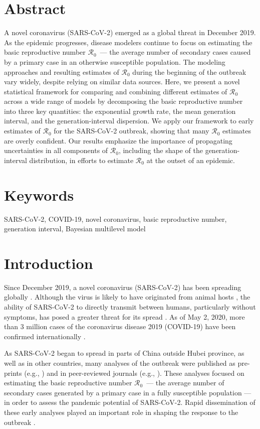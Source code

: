 \documentclass[12pt]{article}
\newcommand{\Ro}{\ensuremath{{\mathcal R}_{0}}\xspace}
\begin{document}
\section*{Abstract}
A novel coronavirus (SARS-CoV-2) emerged as a global threat in December 2019. 
As the epidemic progresses, disease modelers continue to focus on estimating the basic reproductive number \Ro\ --- the average number of secondary cases caused by a primary case in an otherwise susceptible population.
The modeling approaches and resulting estimates of \Ro during the beginning of the outbreak vary widely, despite relying on similar data sources.
Here, we present a novel statistical framework for comparing and combining different estimates of \Ro across a wide range of models by decomposing the basic reproductive number into three key quantities: the exponential growth rate, the mean generation interval, and the generation-interval dispersion.
We apply our framework to early estimates of \Ro for the SARS-CoV-2 outbreak, showing that many \Ro estimates are overly confident.
Our results emphasize the importance of propagating uncertainties in all components of \Ro, including the shape of the generation-interval distribution, in efforts to estimate \Ro at the outset of an epidemic.

\section*{Keywords}

SARS-CoV-2, COVID-19, novel coronavirus, basic reproductive number, generation interval, Bayesian multilevel model

\section{Introduction}

Since December 2019, a novel coronavirus (SARS-CoV-2) has been spreading globally \citep{pneumonia}.
Although the virus is likely to have originated from animal hosts \citep{andersen2020proximal}, the ability of SARS-CoV-2 to directly transmit between humans, particularly without symptoms, has posed a greater threat for its spread \citep{he2020temporal}.
As of May 2, 2020, more than 3 million cases of the coronavirus disease 2019 (COVID-19) have been confirmed internationally \citep{who103}.

As SARS-CoV-2 began to spread in parts of China outside Hubei province, as well as in other countries, many analyses of the outbreak were published as pre-prints (e.g., \cite{bedfordncov, imaincov, liuncov, majumderncov, readncov, zhaoncov}) and in peer-reviewed journals (e.g., \cite{li2020early, riou2020pattern, wu2020nowcasting, zhao2020preliminary}).
These analyses focused on estimating the basic reproductive number \Ro\ --- the average number of secondary cases generated by a primary case in a fully susceptible population \citep{anderson1991infectious, diekmann1990definition} --- in order to assess the pandemic potential of SARS-CoV-2.
Rapid dissemination of these early analyses played an important role in shaping the response to the outbreak \citep{majumder2020early}.
\end{document}
